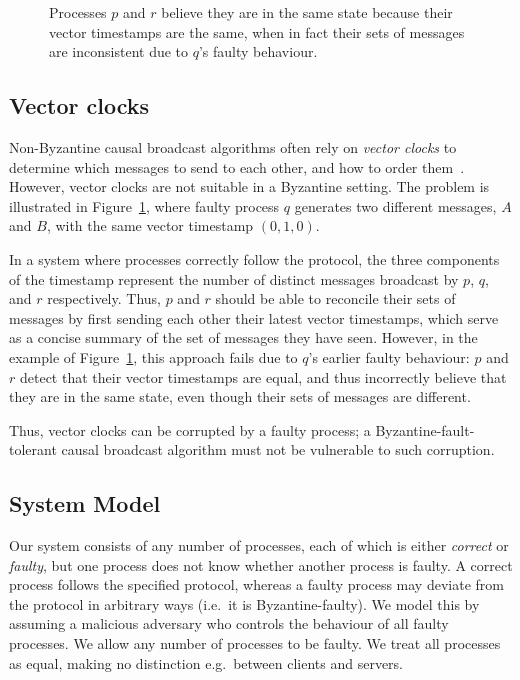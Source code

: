 \documentclass[a4paper,anonymous,USenglish]{lipics-v2019}
\begin{document}
\begin{figure}
    \centering
    
    \caption{Processes $p$ and $r$ believe they are in the same state because their vector timestamps are the same, when in fact their sets of messages are inconsistent due to $q$'s faulty behaviour.}
    \label{fig:vectorclocks}
\end{figure}

\subsection{Vector clocks}

Non-Byzantine causal broadcast algorithms often rely on \emph{vector clocks} to determine which messages to send to each other, and how to order them~\cite{Birman:1991el,Schwarz:1994}.
However, vector clocks are not suitable in a Byzantine setting.
The problem is illustrated in Figure~\ref{fig:vectorclocks}, where faulty process $q$ generates two different messages, $A$ and $B$, with the same vector timestamp $(0, 1, 0)$.

In a system where processes correctly follow the protocol, the three components of the timestamp represent the number of distinct messages broadcast by $p$, $q$, and $r$ respectively.
Thus, $p$ and $r$ should be able to reconcile their sets of messages by first sending each other their latest vector timestamps, which serve as a concise summary of the set of messages they have seen.
However, in the example of Figure~\ref{fig:vectorclocks}, this approach fails due to $q$'s earlier faulty behaviour: $p$ and $r$ detect that their vector timestamps are equal, and thus incorrectly believe that they are in the same state, even though their sets of messages are different.

Thus, vector clocks can be corrupted by a faulty process; a Byzantine-fault-tolerant causal broadcast algorithm must not be vulnerable to such corruption.

\subsection{System Model}\label{sec:system-model}

Our system consists of any number of processes, each of which is either \emph{correct} or \emph{faulty}, but one process does not know whether another process is faulty.
A correct process follows the specified protocol, whereas a faulty process may deviate from the protocol in arbitrary ways (i.e.\ it is Byzantine-faulty).
We model this by assuming a malicious adversary who controls the behaviour of all faulty processes.
We allow any number of processes to be faulty.
We treat all processes as equal, making no distinction e.g.\ between clients and servers.
\end{document}
